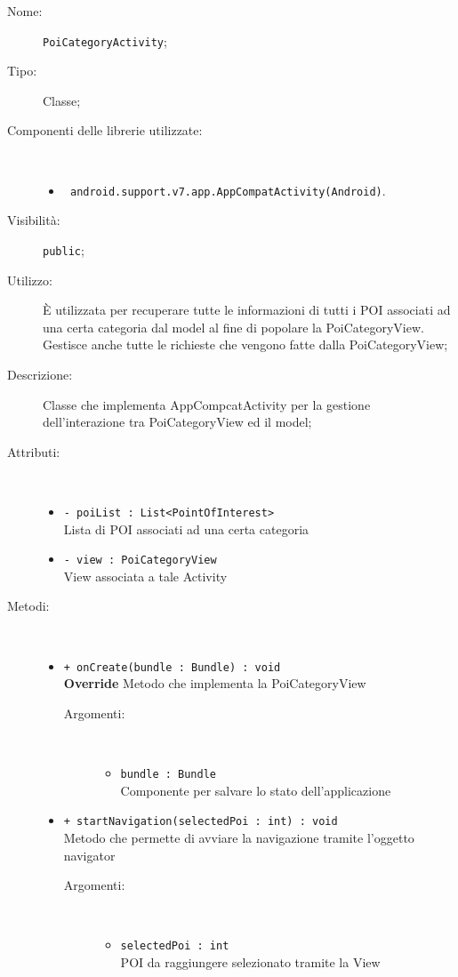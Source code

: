 \documentclass[../DefinizioneDiProdotto.tex]{subfiles}
\begin{document}
    \begin{description}
\item[Nome:] \texttt{PoiCategoryActivity};
\item[Tipo:] Classe;
\item[Componenti delle librerie utilizzate:] \
\begin{itemize}
\item \texttt{ android.support.v7.app.AppCompatActivity(Android)}.

\end{itemize}
\item[Visibilità:] \texttt{public};
\item[Utilizzo:] È utilizzata per recuperare tutte le informazioni di tutti i POI associati ad una certa categoria dal model al fine di popolare la PoiCategoryView. Gestisce anche tutte le richieste che vengono fatte dalla PoiCategoryView;
\item[Descrizione:] Classe che implementa AppCompcatActivity per la gestione dell'interazione tra PoiCategoryView ed il model;
\item[Attributi:] \
\begin{itemize}
\item \texttt{- poiList : List<PointOfInterest>}\\
Lista di POI associati ad una certa categoria

\item \texttt{- view : PoiCategoryView}\\
View associata a tale Activity

\end{itemize}
\item[Metodi:] \
\begin{itemize}
\item \texttt{+ onCreate(bundle : Bundle) : void}\\
\textbf{Override} Metodo che implementa la PoiCategoryView
 \begin{description}
\item[Argomenti:] \
\begin{itemize}
\item \texttt{bundle : Bundle}\\
Componente per salvare lo stato dell'applicazione\end{itemize}
\end{description}
\item \texttt{+ startNavigation(selectedPoi : int) : void}\\
Metodo che permette di avviare la navigazione tramite l'oggetto navigator
 \begin{description}
\item[Argomenti:] \
\begin{itemize}
\item \texttt{selectedPoi : int}\\
POI da raggiungere selezionato tramite la View\end{itemize}
\end{description}
\end{itemize}
\end{description}
\end{document}
